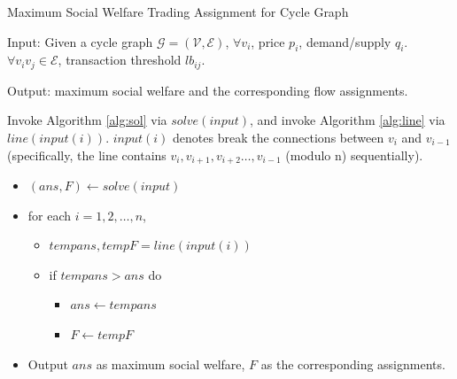 \documentclass{aamas2015}
\begin{document}
\begin{algorithm}[!ht]\label{alg:cycle}
	\caption{Maximum Social Welfare Trading Assignment for Cycle Graph}
	Input: Given a cycle graph $\mathcal{G}=(\mathcal{V},\mathcal{E})$,
	$\forall v_i$, price $p_i$, demand/supply $q_i$.
	$\forall v_iv_j\in \mathcal{E}$, transaction threshold $lb_{ij}$.
	
	Output: maximum social welfare and the corresponding flow assignments.
	
	Invoke Algorithm \ref{alg:sol} via $solve(input)$, and invoke Algorithm \ref{alg:line} via $line(input(i))$.
	$input(i)$ denotes break the connections between $v_i$ and $v_{i-1}$(specifically,  the line contains $v_i, v_{i+1}, v_{i+2}\ldots, v_{i-1}$ (modulo n) sequentially).
	
	\begin{itemize}
		\item $(ans,F)\leftarrow solve(input)$
		\item for each $i=1,2,\ldots,n$,
		\begin{itemize}
			\item $tempans,tempF=line(input(i))$
			\item if $tempans>ans$ do
			\begin{itemize}
				\item $ans\leftarrow tempans$
				\item $F\leftarrow tempF$
			\end{itemize}
		\end{itemize}
		\item Output $ans$ as maximum social welfare, $F$ as the corresponding assignments.
	\end{itemize}
\end{algorithm}
\end{document}
